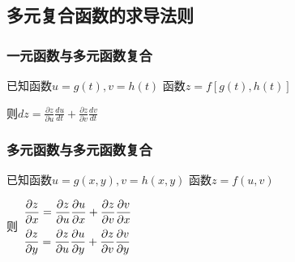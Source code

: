 \documentclass{article} %
\begin{document}
\subsection{多元复合函数的求导法则}
\subsubsection{一元函数与多元函数复合}
已知函数$u=g(t),v=h(t)$ 函数$z=f[g(t),h(t)]$\par
则$\displaystyle dz=\frac{\partial z}{\partial u}\frac{du}{dt}+\frac{\partial z}{\partial v}\frac{dv}{dt}$

\subsubsection{多元函数与多元函数复合}
已知函数$u=g(x,y),v=h(x,y)$ 函数$z=f(u,v)$\par
\vspace{1mm}

则$
\begin{array}{ll}
    \displaystyle \frac{\partial z}{\partial x}=\frac{\partial z}{\partial u}\frac{\partial u}{\partial x}+\frac{\partial z}{\partial v}\frac{\partial v}{\partial x} \vspace{2mm}\\
    \displaystyle \frac{\partial z}{\partial y}=\frac{\partial z}{\partial u}\frac{\partial u}{\partial y}+\frac{\partial z}{\partial v}\frac{\partial v}{\partial y}
\end{array}$
\end{document}

